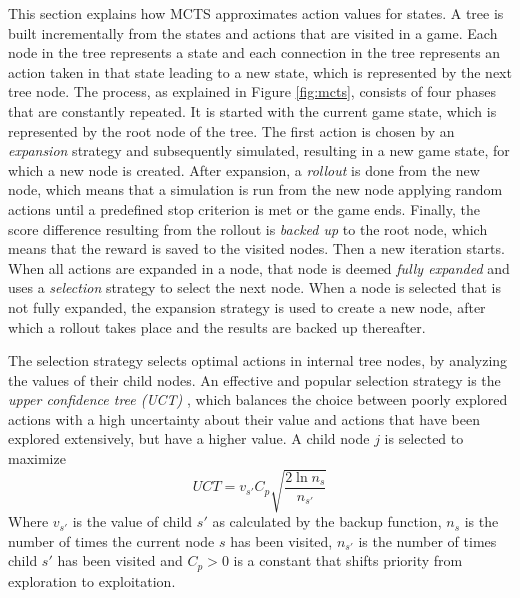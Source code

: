 This section explains how MCTS approximates action values for states.  A tree is
built incrementally from the states and actions that are visited in a game. Each
node in the tree represents a state and each connection in the tree represents
an action taken in that state leading to a new state, which is represented by
the next tree node.  The process, as explained in Figure \ref{fig:mcts},
consists of four phases that are constantly repeated. It is started with the
current game state, which is represented by the root node of the tree. The first
action is chosen by an \emph{expansion} strategy and subsequently simulated,
resulting in a new game state, for which a new node is created. After expansion,
a \emph{rollout} is done from the new node, which means that a simulation is run
from the new node applying random actions until a predefined stop criterion is
met or the game ends. Finally, the score difference resulting from the rollout
is \emph{backed up} to the root node, which means that the reward is saved to the
visited nodes.  Then a new iteration starts. When all actions are expanded in a
node, that node is deemed \emph{fully expanded} and uses a \emph{selection}
strategy to select the next node. When a node is selected that is not fully
expanded, the expansion strategy is used to create a new node, after which a
rollout takes place and the results are backed up thereafter.

The selection strategy selects optimal actions in internal tree nodes, by
analyzing the values of their child nodes. An effective and popular
selection strategy is the \emph{upper confidence tree (UCT)}
\cite{kocsis2006bandit}, which balances the choice between poorly explored
actions with a high uncertainty about their value and actions that have been
explored extensively, but have a higher value. A child node $j$ is selected to
maximize
\begin{equation}
	\label{eq:uct}
	UCT = v_{s'} C_p \sqrt{\frac{2 \ln n_s}{n_{s'}}}
\end{equation}
Where $v_{s'}$ is the value of child $s'$ as calculated by the backup function,
$n_s$ is the number of times the current node $s$ has been visited, $n_{s'}$ is
the number of times child $s'$ has been visited and $C_p > 0$ is a constant
that shifts priority from exploration to exploitation.

